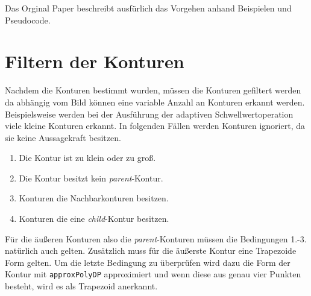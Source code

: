 Das Orginal Paper \cite{journals/cvgip/SuzukiA85} beschreibt ausfürlich das Vorgehen anhand Beispielen und Pseudocode.

\section{Filtern der Konturen}
Nachdem die Konturen bestimmt wurden, müssen die Konturen gefiltert werden da abhängig vom Bild können eine variable Anzahl an Konturen
erkannt werden. Beispielsweise werden bei der Ausführung der adaptiven Schwellwertoperation viele kleine Konturen erkannt. In folgenden Fällen werden Konturen ignoriert, da sie keine Aussagekraft besitzen.
\begin{enumerate}
	\item Die Kontur ist zu klein oder zu groß.
	\item Die Kontur besitzt kein \emph{parent}-Kontur.
	\item Konturen die Nachbarkonturen besitzen.
	\item Konturen die eine \emph{child}-Kontur besitzen.
\end{enumerate}
Für die äußeren Konturen also die \emph{parent}-Konturen müssen die Bedingungen 1.-3. natürlich auch gelten. Zusätzlich muss für die äußerste Kontur eine Trapezoide Form gelten. Um die letzte Bedingung zu überprüfen wird dazu die Form der Kontur mit \texttt{approxPolyDP} approximiert   und wenn diese aus genau vier Punkten besteht, wird es als Trapezoid anerkannt.

